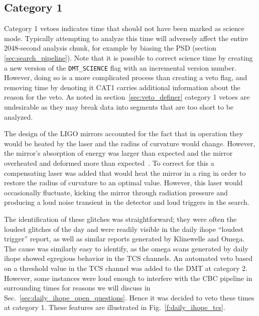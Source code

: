 \subsection{Category 1}

Category 1 vetoes indicates time that should not have been marked as
science mode.  Typically attempting to analyze this time will
adversely affect the entire 2048-second analysis chunk, for example by
biasing the PSD (section \ref{sec:search_pipeline}).  Note that it is
possible to correct science time by creating a new version of the
\texttt{DMT\_SCIENCE} flag with an incremental version number.
However, doing so is a more complicated process than creating a veto
flag, and removing time by denoting it CAT1 carries additional
information about the reason for the veto.  As noted in
section~\ref{sec:veto_definer} category 1 vetoes are undesirable as
they may break data into segments that are too short to be analyzed.


The design of the LIGO mirrors accounted for the fact that in
operation they would be heated by the laser and the radius of
curvature would change.  However, the mirror's absorption of energy
was larger than expected and the mirror overheated and deformed more
than expected~\cite{LIGO-T050064-00-R}.  To correct for this a
compensating laser was added that would heat the mirror in a ring in
order to restore the radius of curvature to an optimal value.
However, this laser would occasionally fluctuate, kicking the mirror
through radiation pressure and producing a loud noise transient in the
detector and loud triggers in the search.

The identification of these glitches was straightforward; they were
often the loudest glitches of the day and were readily visible in the
daily ihope ``loudest trigger'' report, as well as similar reports
generated by Klinewelle and Omega.  The cause was similarly easy to
identify, as the omega scans generated by daily ihope showed egregious
behavior in the TCS channels.  An automated veto based on a threshold
value in the TCS channel was added to the DMT at category 2.  However,
some instances were loud enough to interfere with the CBC pipeline in
surrounding times for reasons we will discuss in
Sec.~\ref{sec:daily_ihope_open_questions}.  Hence it was decided to
veto these times at category 1.  These features are illustrated in
Fig.~\ref{f:daily_ihope_tcs}.  


%
% 

